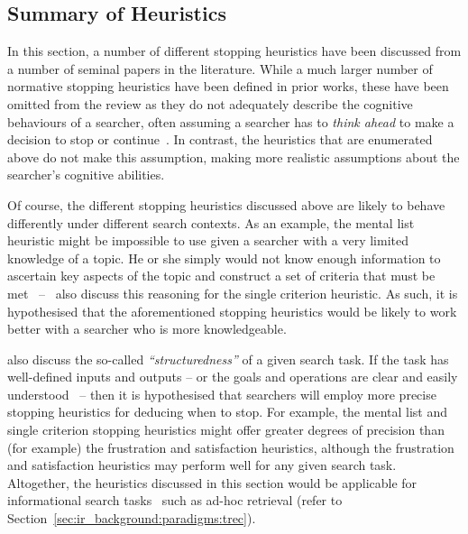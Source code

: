 \subsection{Summary of Heuristics}
In this section, a number of different stopping heuristics have been discussed from a number of seminal papers in the literature. While a much larger number of normative stopping heuristics have been defined in prior works, these have been omitted from the review as they do not adequately describe the cognitive behaviours of a searcher, often assuming a searcher has to \emph{think ahead} to make a decision to stop or continue~\citep{browne2004stopping_rules}. In contrast, the heuristics that are enumerated above do not make this assumption, making more realistic assumptions about the searcher's cognitive abilities.

Of course, the different stopping heuristics discussed above are likely to behave differently under different search contexts. As an example, the mental list heuristic might be impossible to use given a searcher with a very limited knowledge of a topic. He or she simply would not know enough information to ascertain key aspects of the topic and construct a set of criteria that must be met~\citep{browne2005stopping_rules} --~\cite{gigerenzer1999betting} also discuss this reasoning for the single criterion heuristic. As such, it is hypothesised that the aforementioned stopping heuristics would be likely to work better with a searcher who is more knowledgeable.


\cite{browne2005stopping_rules} also discuss the so-called \emph{``structuredness''} of a given search task. If the task has well-defined inputs and outputs -- or the goals and operations are clear and easily understood~\citep{simon1996sciences} -- then it is hypothesised that searchers will employ more precise stopping heuristics for deducing when to stop. For example, the mental list and single criterion stopping heuristics might offer greater degrees of precision than (for example) the frustration and satisfaction heuristics, although the frustration and satisfaction heuristics may perform well for any given search task. Altogether, the heuristics discussed in this section would be applicable for informational search tasks~\citep{browne2005stopping_rules} such as ad-hoc retrieval (refer to Section~\ref{sec:ir_background:paradigms:trec}).

